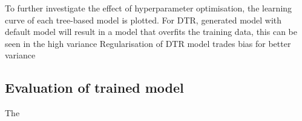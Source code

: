 To further investigate the effect of hyperparameter optimisation, the learning curve of each tree-based model is plotted. For DTR, generated model with default model will result in a model that overfits the training data, this can be seen in the high variance   Regularisation of DTR model trades bias for better variance 

\subsection{Evaluation of trained model}\label{sec:BBM_model_eval}

The 